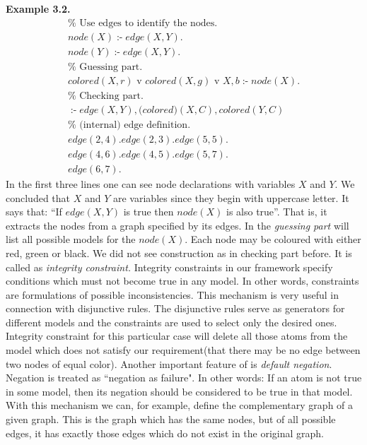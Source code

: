\documentclass[14pt,a4paper, titlepage]{article}
\DeclareMathOperator{\leftimpl}{:-}
\begin{document}
\textbf{Example 3.2.}
\begin{align*}
&\%  \text{ Use edges to identify the nodes.}\\
&\mathit{node}(X) \leftimpl \mathit{edge}(X, Y). &\\
&\mathit{node}(Y) \leftimpl \mathit{edge}(X, Y). & \\
&\%  \text{ Guessing part.} \\
&\mathit{colored}(X, r) \text{ v } \mathit{colored}(X, g) \text{ v } \mathit{X, b} \leftimpl \mathit{node}(X). & \\
&\%  \text{ Checking part.} \\
&\leftimpl \mathit{edge}(X, Y), \mathit(colored)(X, C), \mathit{colored}(Y, C) & \\
&\% \text{ (internal) edge definition.} \\
&\mathit{edge}(2, 4). \mathit{edge}(2, 3). \mathit{edge}(5, 5). & \\
&\mathit{edge}(4, 6). \mathit{edge}(4, 5). \mathit{edge}(5, 7). & \\
&\mathit{edge}(6, 7). &
\end{align*} 
In the first three lines one can see node declarations with variables $X$ and $Y$. We concluded that $X$ and $Y$ are variables since they begin with uppercase letter. It says that: \enquote{If $\mathit{edge}(X,Y)$ is true then $\mathit{node(X)}$ is also true}. That is, it extracts the nodes from a graph specified by its edges. In the \emph{guessing part} \dlvhex{} will list all possible models for the $\mathit{node}(X)$. Each node may be coloured with either red, green or black. We did not see construction as in checking part before. It is called as \emph{integrity constraint.} Integrity constraints in our framework specify conditions which must not become true in any model. In other words, constraints are formulations of possible inconsistencies. This mechanism is very useful in connection with disjunctive rules. The disjunctive rules serve as generators for different models and the constraints are used to select only the desired ones. Integrity constraint for this particular case will delete all those atoms from the model which does not satisfy our requirement(that there may be no edge between two nodes of equal color). Another important feature of \dlvhex{} is \emph{default negation}. Negation is treated as ``negation as failure". In other words: If an atom is not true in some model, then its negation should be considered to be true in that model. With this mechanism we can, for example, define the complementary graph of a given graph. This is the graph which has the same nodes, but of all possible edges, it has exactly those edges which do not exist in the original graph.  \newpage
\end{document}
